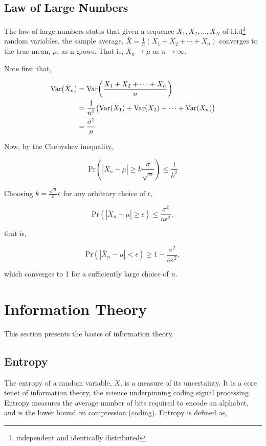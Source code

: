 \documentclass[11pt]{amsart}
\begin{document}
\subsection{Law of Large Numbers}

The law of large numbers states that given a sequence $X_1, X_2, \dots, X_N$ of i.i.d\footnote{independent and identically distributed} random variables, the sample average, $\bar{X} = \frac{1}{n}(X_1 + X_2 + \cdots + X_n)$ converges to the true mean, $\mu$, as n grows. That is, $\bar{X}_n \rightarrow \mu$ as $n \rightarrow \infty$.

Note first that,

\begin{align}
\text{Var}(\bar{X}_n) &= \text{Var}\bigg(\frac{X_1 + X_2 + \cdots + X_n}{n}\bigg) \notag \\
&= \frac{1}{n^2}\big(\text{Var}(X_1) + \text{Var}(X_2) + \cdots + \text{Var}(X_n)\big) \notag \\
&= \frac{\sigma^2}{n} \notag
\end{align}

Now, by the Chebyshev inequality,

$$
\text{Pr}(|\bar{X}_n - \mu| \geq k\frac{\sigma}{\sqrt{n}}) \leq \frac{1}{k^2}
$$

Choosing $k = \frac{\sqrt{n}}{\sigma}\epsilon$ for any arbitrary choice of $\epsilon$,

$$
\text{Pr}(|\bar{X}_n - \mu| \geq \epsilon) \leq \frac{\sigma^2}{n\epsilon^2},
$$

that is,

$$
\text{Pr}(|\bar{X}_n - \mu| < \epsilon) \geq 1 - \frac{\sigma^2}{n\epsilon^2},
$$

which converges to 1 for a sufficiently large choice of $n$.

\section{Information Theory}

This section presents the basics of information theory.

\subsection{Entropy}

The entropy of a random variable, $X$, is a measure of its uncertainty. It is a core tenet of information theory, the science underpinning coding signal processing. Entropy measures the average number of bits required to encode an alphabet, and is the lower bound on compression (coding). Entropy is defined as,
\end{document}
